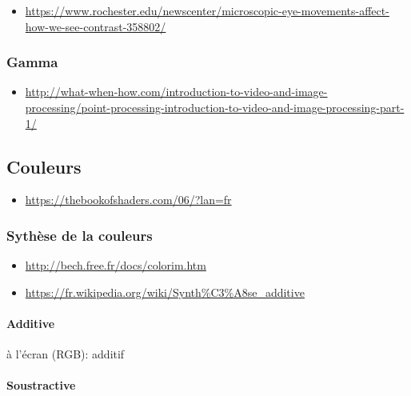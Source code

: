 \documentclass[
  french,
]{book}
\providecommand{\tightlist}{%
  \setlength{\itemsep}{0pt}\setlength{\parskip}{0pt}}
\begin{document}
\begin{itemize}
\tightlist
\item
  \url{https://www.rochester.edu/newscenter/microscopic-eye-movements-affect-how-we-see-contrast-358802/}
\end{itemize}

\hypertarget{gamma}{%
\subsubsection{Gamma}\label{gamma}}

\begin{itemize}
\tightlist
\item
  \url{http://what-when-how.com/introduction-to-video-and-image-processing/point-processing-introduction-to-video-and-image-processing-part-1/}
\end{itemize}

\hypertarget{couleurs}{%
\subsection{Couleurs}\label{couleurs}}

\begin{itemize}
\tightlist
\item
  \url{https://thebookofshaders.com/06/?lan=fr}
\end{itemize}

\hypertarget{sythuxe8se-de-la-couleurs}{%
\subsubsection{Sythèse de la couleurs}\label{sythuxe8se-de-la-couleurs}}

\begin{itemize}
\item
  \url{http://bech.free.fr/docs/colorim.htm}
\item
  \url{https://fr.wikipedia.org/wiki/Synth\%C3\%A8se_additive}
\end{itemize}

\hypertarget{additive}{%
\paragraph{Additive}\label{additive}}

à l'écran (RGB): additif

\hypertarget{soustractive}{%
\paragraph{Soustractive}\label{soustractive}}
\end{document}
